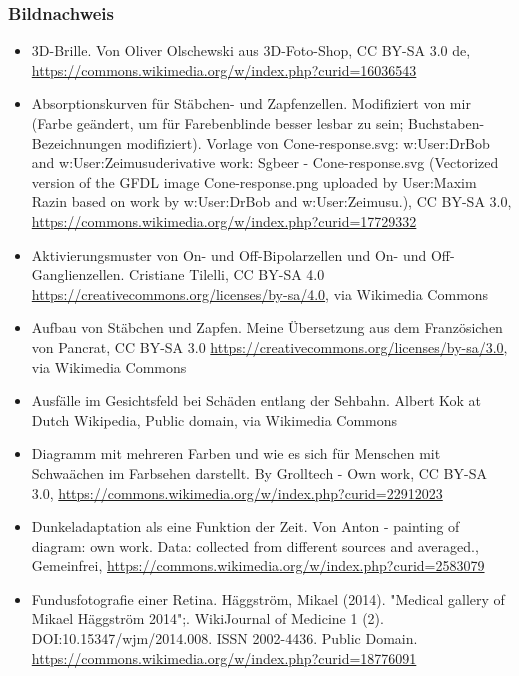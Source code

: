 \documentclass{beamer}
\begin{document}


\begin{frame}
\frametitle{Bildnachweis}
\begin{tiny}



 
\begin{itemize}

\item
3D-Brille. Von Oliver Olschewski aus 3D-Foto-Shop, CC BY-SA 3.0 de, \url{https://commons.wikimedia.org/w/index.php?curid=16036543}

\item
Absorptionskurven für Stäbchen- und Zapfenzellen. Modifiziert von mir (Farbe geändert, um für Farebenblinde besser lesbar zu sein; Buchstaben-Bezeichnungen modifiziert). Vorlage von Cone-response.svg: w:User:DrBob and w:User:Zeimusuderivative work: Sgbeer - Cone-response.svg (Vectorized version of the GFDL image Cone-response.png uploaded by User:Maxim Razin based on work by w:User:DrBob and w:User:Zeimusu.), CC BY-SA 3.0, \url{https://commons.wikimedia.org/w/index.php?curid=17729332}

\item
Aktivierungsmuster von On- und Off-Bipolarzellen und On- und Off-Ganglienzellen. Cristiane Tilelli, CC BY-SA 4.0 \url{https://creativecommons.org/licenses/by-sa/4.0}, via Wikimedia Commons

\item
Aufbau von Stäbchen und Zapfen. Meine Übersetzung aus dem Französichen von Pancrat, CC BY-SA 3.0 \url{https://creativecommons.org/licenses/by-sa/3.0}, via Wikimedia Commons

\item
Ausfälle im Gesichtsfeld bei Schäden entlang der Sehbahn. Albert Kok at Dutch Wikipedia, Public domain, via Wikimedia Commons
 
\item
Diagramm mit mehreren Farben und wie es sich für Menschen mit Schwaächen im Farbsehen darstellt. By Grolltech - Own work, CC BY-SA 3.0, \url{https://commons.wikimedia.org/w/index.php?curid=22912023}


\item
Dunkeladaptation als eine Funktion der Zeit. Von Anton - painting of diagram: own work. Data: collected from different sources and averaged., Gemeinfrei, \url{https://commons.wikimedia.org/w/index.php?curid=2583079}

\item
Fundusfotografie einer Retina. Häggström, Mikael (2014). "Medical gallery of Mikael Häggström 2014";. WikiJournal of Medicine 1 (2). DOI:10.15347/wjm/2014.008. ISSN 2002-4436. Public Domain. \url{https://commons.wikimedia.org/w/index.php?curid=18776091}
   

\end{itemize}
\end{tiny}
\end{frame}
\end{document}

